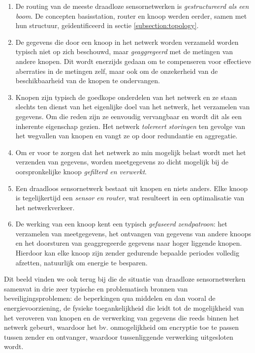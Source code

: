 \begin{enumerate}

\item{De routing van de meeste draadloze sensornetwerken is
\emph{gestructureerd als een boom}. De concepten basisstation, router en knoop
werden eerder, samen met hun structuur, ge\"identificeerd in sectie
\ref{subsection:topology}.}

\item{De gegevens die door een knoop in het netwerk worden verzameld worden
typisch niet op zich beschouwd, maar \emph{geaggregeerd} met de metingen van
andere knopen. Dit wordt enerzijds gedaan om te compenseren voor effectieve
aberraties in de metingen zelf, maar ook om de onzekerheid van de
beschikbaarheid van de knopen te ondervangen.}

\item{Knopen zijn typisch de goedkope onderdelen van het netwerk en ze staan
slechts ten dienst van het eigenlijke doel van het netwerk, het verzamelen van
gegevens. Om die reden zijn ze eenvoudig vervangbaar en wordt dit als een
inherente eigenschap gezien. Het netwerk \emph{tolereert storingen} ten gevolge
van het wegvallen van knopen en vangt ze op door redundantie en aggregatie.}

\item{Om er voor te zorgen dat het netwerk zo min mogelijk belast wordt met het
verzenden van gegevens, worden meetgegevens zo dicht mogelijk bij de
oorspronkelijke knoop \emph{gefilterd en verwerkt}.}

\item{Een draadloos sensornetwerk bestaat uit knopen en niets anders. Elke
knoop is tegelijkertijd een \emph{sensor en router}, wat resulteert in een
optimalisatie van het netwerkverkeer.}

\item{De werking van een knoop kent een typisch \emph{gefaseerd zendpatroon}:
het verzamelen van meetgegevens, het ontvangen van gegevens van andere knoops en
het doorsturen van geaggregeerde gegevens naar hoger liggende knopen. Hierdoor
kan elke knoop zijn zender gedurende bepaalde periodes volledig afzetten,
natuurlijk om energie te besparen.}

\end{enumerate}

Dit beeld vinden we ook terug bij \cite{aschenbruck2012security} die de
situatie van draadloze sensornetwerken samenvat in drie zeer typische en
problematisch bronnen van beveiligingsproblemen: de beperkingen qua middelen en
dan vooral de energievoorziening, de fysieke toegankelijkheid die leidt tot de
mogelijkheid van het veroveren van knopen en de verwerking van gegevens die
reeds binnen het netwerk gebeurt, waardoor het bv. onmogelijkheid om encryptie
toe te passen tussen zender en ontvanger, waardoor tussenliggende verwerking
uitgesloten wordt.

